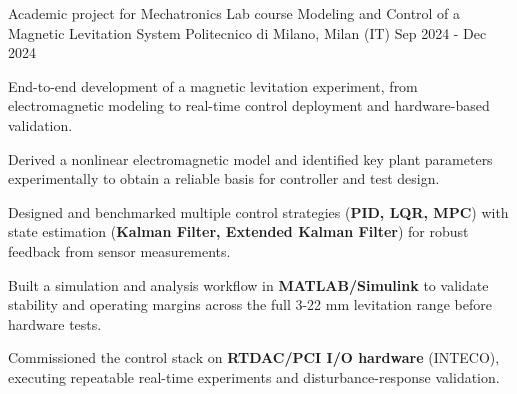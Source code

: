 
\cventry
{Academic project for Mechatronics Lab course}
{Modeling and Control of a Magnetic Levitation System}
{Politecnico di Milano, Milan (IT)}
{Sep 2024 - Dec 2024}
{
    End-to-end development of a magnetic levitation experiment, from electromagnetic modeling to real-time control deployment and hardware-based validation.
    \newline
    \vspace{4mm}
    \begin{cvitems}
        \item {Derived a nonlinear electromagnetic model and identified key plant parameters experimentally to obtain a reliable basis for controller and test design.}
        \item {Designed and benchmarked multiple control strategies (\textbf{PID, LQR, MPC}) with state estimation (\textbf{Kalman Filter, Extended Kalman Filter}) for robust feedback from sensor measurements.}
        \item {Built a simulation and analysis workflow in \textbf{MATLAB/Simulink} to validate stability and operating margins across the full 3-22 mm levitation range before hardware tests.}
        \item {Commissioned the control stack on \textbf{RTDAC/PCI I/O hardware} (INTECO), executing repeatable real-time experiments and disturbance-response validation.}
    \end{cvitems}
}
